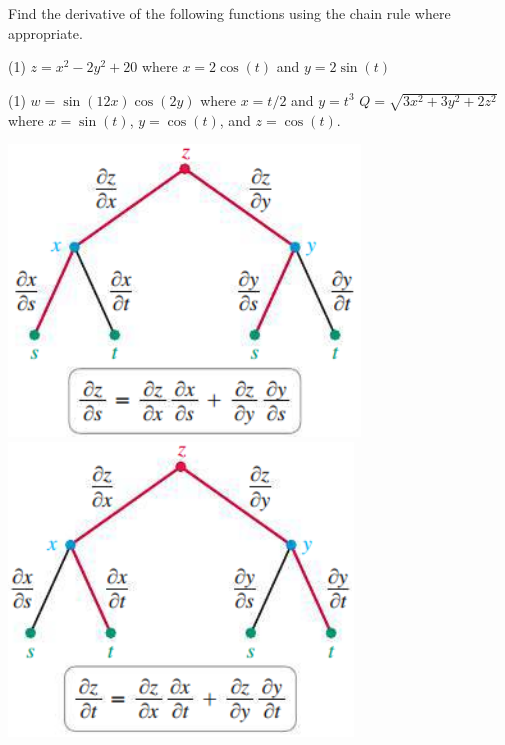 \documentclass[mathNotesPreamble]{subfiles}
\begin{document}
  \begin{ex*}
    Find the derivative of the following functions using the chain rule where appropriate.
  \end{ex*}
  \begin{tasks}[after-item-skip=\stretch{1}, label=](1)
    \task $z=x^2-2y^2+20$ where $x=2\cos(t)$ and $y=2\sin(t)$
  \end{tasks}
  \pagebreak
  \begin{tasks}[after-item-skip=\stretch{1}, label=, resume](1)
    \task $w=\sin(12x)\cos(2y)$ where $x=t/2$ and $y=t^3$
    \task $Q=\sqrt{3x^2+3y^2+2z^2}$ where $x=\sin(t)$, $y=\cos(t)$, and $z=\cos(t)$.
  \end{tasks}
  \pagebreak

  \noindent
  \begin{center}
    \includegraphics[width=0.315\linewidth]{images/briggs_15_04/fig15_39}
    \includegraphics[width=0.315\linewidth, trim={0mm 1.0mm 0mm 0mm},clip]{images/briggs_15_04/fig15_40}
  \end{center}
\end{document}
